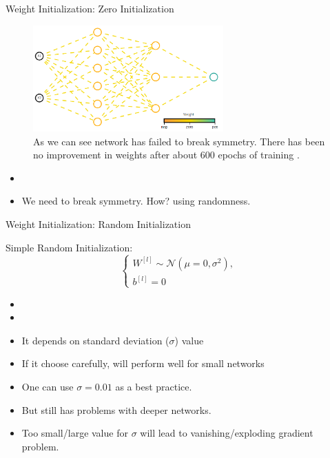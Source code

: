 \begin{frame}{Weight Initialization: Zero Initialization}
	\begin{figure}[H]
		\centering
		\includegraphics[width=0.65\textwidth]{Images/zero-init.png}
		\caption{As we can see network has failed to break symmetry. There has been no improvement in weights after about 600 epochs of training \cite{katanforoosh-kunin}.}
	\end{figure}
	\begin{itemize}
		\item[]
		\item We need to break symmetry. How? using randomness.
	\end{itemize}
\end{frame}

\begin{frame}{Weight Initialization: Random Initialization}
	\begin{block}{Simple Random Initialization:}
		\[
		\begin{cases}
			W^{[l]} \sim \mathcal{N}\left(\mu=0, \sigma^2\right), \\
			b^{[l]} = 0
		\end{cases}
		\]
	\end{block}
	\pause
	\begin{itemize}
		\item[]
		\item[]
		\item It depends on standard deviation ($\sigma$) value
		\item If it choose carefully, will perform well for small networks
		\item One can use $\sigma = 0.01$ as a best practice.
		\item But still has problems with deeper networks.
		\item Too small/large value for $\sigma$ will lead to vanishing/exploding gradient problem.
	\end{itemize}
\end{frame}

